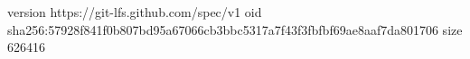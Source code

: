 version https://git-lfs.github.com/spec/v1
oid sha256:57928f841f0b807bd95a67066cb3bbc5317a7f43f3fbfbf69ae8aaf7da801706
size 626416
